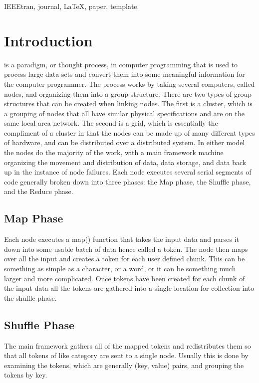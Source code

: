 \documentclass[report]{IEEEtran}
\begin{document}
\begin{IEEEkeywords}
IEEEtran, journal, \LaTeX, paper, template.
\end{IEEEkeywords}

\section{Introduction}

 is a paradigm, or thought process, in computer programming that is used to process large data sets and convert them into some meaningful information for the computer programmer. The process works by taking several computers, called nodes, and organizing them into a group structure. There are two types of group structures that can be created when linking nodes. The first is a cluster, which is a grouping of nodes that all have similar physical specifications and are on the same local area network. The second is a grid, which is essentially the compliment of a cluster in that the nodes can be made up of many different types of hardware, and can be distributed over a distributed system.
In either model the nodes do the majority of the work, with a main framework machine organizing the movement and distribution of data, data storage, and data back up in the instance of node failures. Each node executes several serial segments of code generally broken down into three phases: the Map phase, the Shuffle phase, and the Reduce phase.

\subsection{Map Phase}
Each node executes a map() function that takes the input data and parses it down into some usable batch of data hence called a token. The node then maps over all the input and creates a token for each user defined chunk. This can be something as simple as a character, or a word, or it can be something much larger and more complicated. Once tokens have been created for each chunk of the input data all the tokens are gathered into a single location for collection into the shuffle phase.

\subsection{Shuffle Phase}
The main framework gathers all of the mapped tokens and redistributes them so that all tokens of like category are sent to a single node. Usually this is done by examining the tokens, which are generally (key, value) pairs, and grouping the tokens by key.
\end{document}
